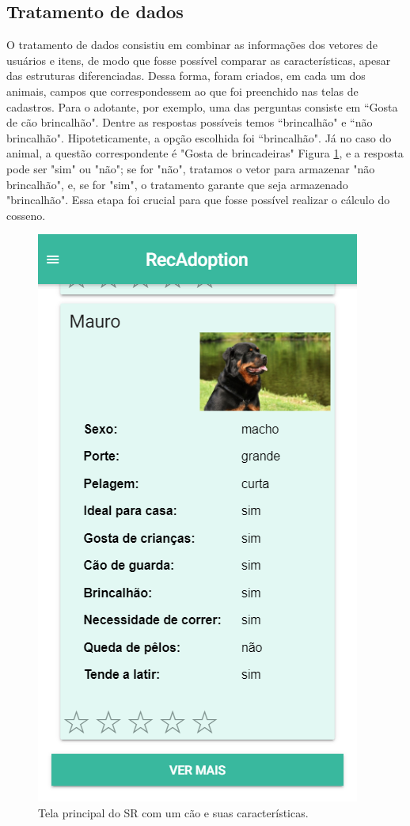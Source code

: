 \documentclass[portuguese]{textolivre}
\begin{document}
\subsection {Tratamento de dados}
O tratamento de dados consistiu em combinar as informações dos vetores de usuários e itens, de modo que fosse possível comparar as características, apesar das estruturas diferenciadas. Dessa forma, foram criados, em cada um dos animais, campos que correspondessem ao que foi preenchido nas telas de cadastros. Para o adotante, por exemplo, uma das perguntas consiste em ``Gosta de cão brincalhão". Dentre as respostas possíveis temos ``brincalhão" e ``não brincalhão". Hipoteticamente, a opção escolhida foi ``brincalhão". Já no caso do animal, a questão correspondente é "Gosta de brincadeiras" Figura \ref{fig:010}, e a resposta pode ser "sim" ou "não"; se for "não", tratamos o vetor para armazenar "não brincalhão", e, se for "sim", o tratamento garante que seja armazenado "brincalhão". 
Essa etapa foi crucial para que fosse possível realizar o cálculo do cosseno. 

\begin{figure}
	\centering
	\includegraphics[scale=0.90]{imagens/fig-011.png}
	\caption{Tela principal do SR com um cão e suas características.}
	\label{fig:010}
\end{figure}
\end{document}
